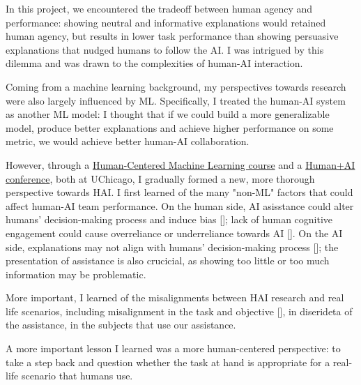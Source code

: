 

In this project, we encountered the tradeoff between human agency and performance: showing neutral and informative explanations would retained human agency, but results in lower task performance than showing persuasive explanations that nudged humans to follow the AI. 
I was intrigued by this dilemma and was drawn to the complexities of human-AI interaction. 

Coming from a machine learning background, my perspectives towards research were also largely influenced by ML. 
Specifically, I treated the human-AI system as another ML model: I thought that if we could build a more generalizable model, produce better explanations and achieve higher performance on some metric, we would achieve better human-AI collaboration. 

However, through a \href{https://github.com/ChicagoHAI/human-centered-machine-learning}{Human-Centered Machine Learning course} and a \href{https://datascience.uchicago.edu/events/human-ai-conference/}{Human+AI conference}, both at UChicago, 
I gradually formed a new, more thorough perspective towards HAI.
I first learned of the many "non-ML" factors that could affect human-AI team performance. On the human side, AI asisstance could alter humans' decision-making process and induce bias []; lack of human cognitive engagement could cause overreliance or underreliance towards AI []. On the AI side, explanations may not align with humans' decision-making process []; the presentation of assistance is also crucicial, as showing too little or too much information may be problematic.


More important, I learned of the misalignments between HAI research and real life scenarios, including misalignment in the task and objective [], in diserideta of the assistance, in the subjects that use our assistance. 


A more important lesson I learned was a more human-centered perspective: to take a step back and question whether the task at hand is appropriate for a real-life scenario that humans use. 





